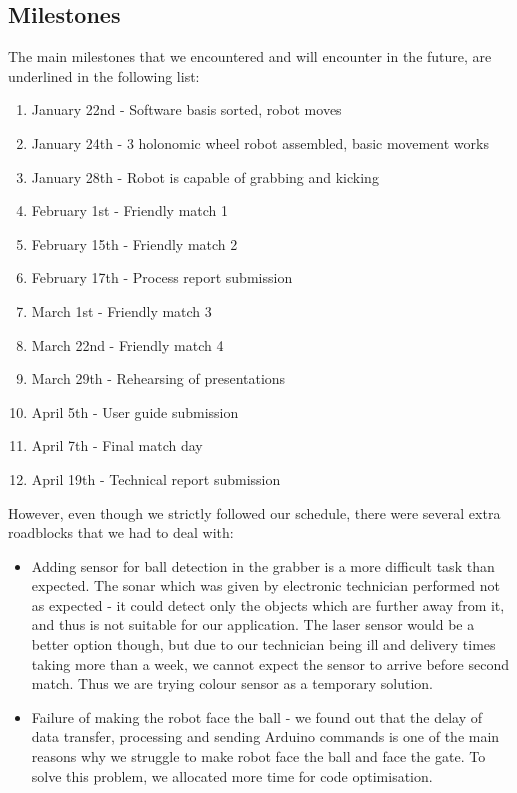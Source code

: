 \documentclass[12pt,oneside]{article}
\begin{document}
		\subsection{Milestones}
			The main milestones that we encountered and will encounter in the future, are underlined in the following list:
			\begin{enumerate}
				\item January 22nd - Software basis sorted, robot moves
				\item January 24th - 3 holonomic wheel robot assembled, basic movement works
				\item January 28th - Robot is capable of grabbing and kicking
				\item February 1st - Friendly match 1
				\item February 15th - Friendly match 2
				\item February 17th - Process report submission
				\item March 1st - Friendly match 3
				\item March 22nd - Friendly match 4
				\item March 29th - Rehearsing of presentations
				\item April 5th - User guide submission
				\item April 7th - Final match day
				\item April 19th - Technical report submission
			\end{enumerate}
			However, even though we strictly followed our schedule, there were several extra roadblocks that we had to deal with:
			\begin{itemize}
				\item Adding sensor for ball detection in the grabber is a more difficult task than expected. The sonar which was given by electronic technician performed not as expected - it could detect only the objects which are further away from it, and thus is not suitable for our application. The laser sensor would be a better option though, but due to our technician being ill and delivery times taking more than a week, we cannot expect the sensor to arrive before second match. Thus we are trying colour sensor as a temporary solution.
				\item Failure of making the robot face the ball - we found out that the delay of data transfer, processing and sending Arduino commands is one of the main reasons why we struggle to make robot face the ball and face the gate. To solve this problem, we allocated more time for code optimisation.
			\end{itemize}
\end{document}
